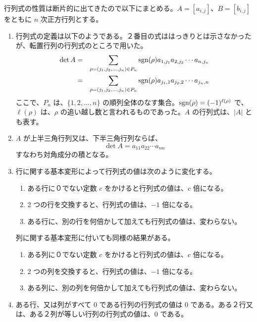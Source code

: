 行列式の性質は断片的に出てきたので以下にまとめる。$A = [a_{i,j}]$、$B = [b_{i,j}]$ をともに $n$ 次正方行列とする。
\begin{enumerate}
\item 行列式の定義は以下のようである。２番目の式ははっきりとは示さなかったが、転置行列の行列式のところで用いた。
\begin{eqnarray*}
\det A & = & \sum_{\rho = (j_1,j_2,\ldots,j_n)\in P_n} \mbox{{\rm sgn}}(\rho)a_{1,j_1}a_{2,j_2}\cdots a_{n,j_n}\\
& = & \sum_{\rho = (j_1,j_2,\ldots,j_n)\in P_n} \mbox{{\rm sgn}}(\rho)a_{j_1,1}a_{j_2,2}\cdots a_{j_n,n}
\end{eqnarray*}
ここで、$P_n$ は、$\{1,2,\ldots, n\}$ の順列全体のなす集合。$\mbox{{\rm sgn}}(\rho) = (-1)^{\ell(\rho)}$ で、$\ell(\rho)$ は、$\rho$ の追い越し数と言われるものであった。$A$ の行列式は、$|A|$ とも表す。

\item $A$ が上半三角行列又は、下半三角行列ならば、
$$\det A = a_{11}a_{22}\cdots a_{nn}$$
すなわち対角成分の積となる。

\item 行に関する基本変形によって行列式の値は次のように変化する。
\begin{enumerate}
\item ある行に０でない定数 $c$ をかけると行列式の値は、$c$ 倍になる。
\item 2 つの行を交換すると、行列式の値は、$-1$ 倍になる。
\item ある行に、別の行を何倍かして加えても行列式の値は、変わらない。
\end{enumerate}
列に関する基本変形に付いても同様の結果がある。
\begin{enumerate}
\item ある列に０でない定数 $c$ をかけると行列式の値は、$c$ 倍になる。
\item 2 つの列を交換すると、行列式の値は、$-1$ 倍になる。
\item ある列に、別の列を何倍かして加えても行列式の値は、変わらない。
\end{enumerate}

\item ある行、又は列がすべて 0 である行列の行列式の値は $0$ である。ある２行又は、ある２列が等しい行列の行列式の値は、0 である。


\end{enumerate}
